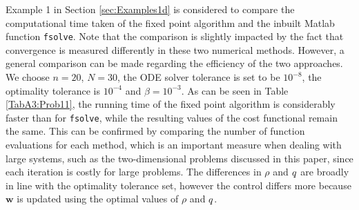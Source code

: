 
Example 1 in Section \ref{sec:Examples1d} is considered to compare the computational time taken of the fixed point algorithm and the inbuilt Matlab function \texttt{fsolve}. Note that the comparison is slightly impacted by the fact that convergence is measured differently in these two numerical methods. However, a general comparison can be made regarding the efficiency of the two approaches.
We choose $n=20$, $N=30$, the ODE solver tolerance is set to be $10^{-8}$, the optimality tolerance is $10^{-4}$ and $\beta = 10^{-3}$. 
As can be seen in Table \ref{TabA3:Prob11}, the running time of the fixed point algorithm is considerably faster than for \texttt{fsolve}, while the resulting values of the cost functional remain the same. This can be confirmed by comparing the number of function evaluations for each method, which is an important measure when dealing with large systems, such as the two-dimensional problems discussed in this paper, since each iteration is costly for large problems. The differences in $\rho$ and $q$ are broadly in line with the optimality tolerance set, however the control differs more because $\mathbf{w}$ is updated using the optimal values of $\rho$ and $q$. 
%
 \label{TabA3:Prob11}
